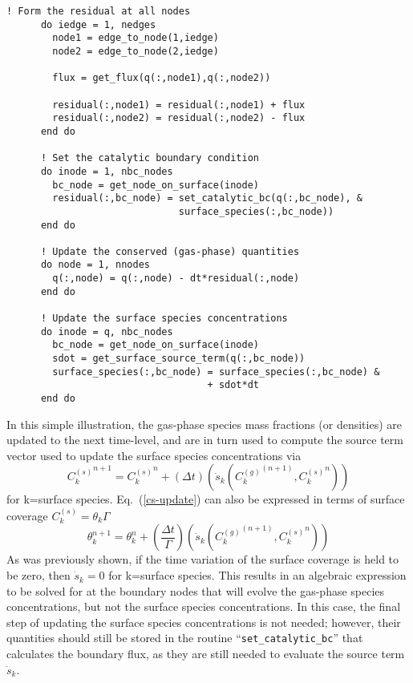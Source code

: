 \documentclass{report}
\newcommand{\eref}[1]{Eq.~(\ref{#1})}
\newcommand{\sk}{\dot{s}_k}
\newcommand{\cg}[1]{{C_{#1}^{(g)}}}
\newcommand{\cs}[1]{{C_{#1}^{(s)}}}
\begin{document}
\begin{enumerate}[label=(\alph*)]
\begin{lstlisting}[language=FORTRAN, caption=Loosely Coupled Implementation]
      ! Form the residual at all nodes
      do iedge = 1, nedges
        node1 = edge_to_node(1,iedge)
        node2 = edge_to_node(2,iedge)

        flux = get_flux(q(:,node1),q(:,node2))

        residual(:,node1) = residual(:,node1) + flux
        residual(:,node2) = residual(:,node2) - flux
      end do

      ! Set the catalytic boundary condition
      do inode = 1, nbc_nodes
        bc_node = get_node_on_surface(inode)
        residual(:,bc_node) = set_catalytic_bc(q(:,bc_node), &
                              surface_species(:,bc_node))
      end do

      ! Update the conserved (gas-phase) quantities
      do node = 1, nnodes
        q(:,node) = q(:,node) - dt*residual(:,node)
      end do

      ! Update the surface species concentrations
      do inode = q, nbc_nodes
        bc_node = get_node_on_surface(inode)
        sdot = get_surface_source_term(q(:,bc_node))
        surface_species(:,bc_node) = surface_species(:,bc_node) &
                                   + sdot*dt
      end do

    \end{lstlisting}
    In this simple illustration, the gas-phase species mass fractions (or
    densities) are updated to the next time-level, and are in turn used to
    compute the source term vector used to update the surface species
    concentrations via
    \begin{equation}
      \cs{k}^{n+1} = \cs{k}^{n} + \left(\Delta
      t\right)\left(\sk(\cg{k}^{(n+1)},\cs{k}^{n})\right)
      \label{cs-update}
    \end{equation}
    for k=surface species.  \eref{cs-update} can also be expressed in terms of
    surface coverage $\cs{k} = \theta_k \Gamma$
    \begin{equation}
      \theta_{k}^{n+1} = \theta_{k}^{n} + \left(\frac{\Delta t}{\Gamma}
      \right)\left(\sk(\cg{k}^{(n+1)},\cs{k}^{n})\right)
      \label{theta-update}
    \end{equation}
    As was previously shown, if the time variation of the surface coverage is
    held to be zero, then $\sk = 0$ for k=surface species.  This results in an
    algebraic expression to be solved for at the boundary nodes that will evolve
    the gas-phase species concentrations, but not the surface species
    concentrations.  In this case, the final step of updating the surface
    species concentrations is not needed; however, their quantities should still
    be stored in the routine ``\verb|set_catalytic_bc|'' that calculates the
    boundary flux, as they are still needed to evaluate the source term $\sk$.


\end{enumerate}
\end{document}
